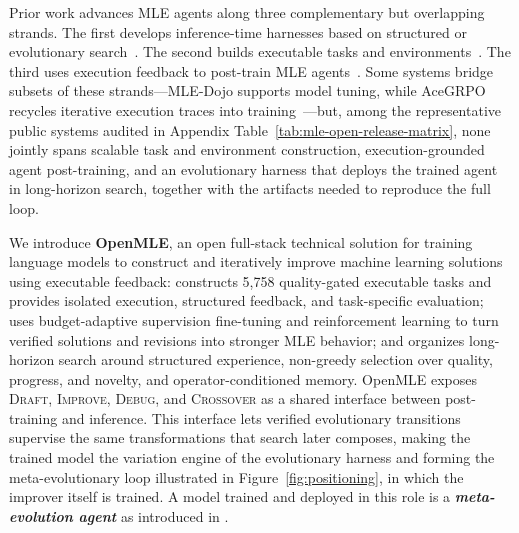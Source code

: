 Prior work advances MLE agents along three complementary but overlapping strands. The first develops inference-time harnesses based on structured or evolutionary search~\citep{jiang2025aide,fang2025mlzero,nam2025mlestar,du2025automlgen,liu2025ml,zhu2026toward,toledo2025airesearchagents,internscience2026mlevolve}. The second builds executable tasks and environments~\citep{qiang2025mledojo,qiang2025mlesmith,nathani2025mlgym,lupidi2026airs}. The third uses execution feedback to post-train MLE agents~\citep{liu2025mlagent,li2025mlerl,yang2025rlmleagents,cai2026acegrpo}. Some systems bridge subsets of these strands---MLE-Dojo supports model tuning, while AceGRPO recycles iterative execution traces into training~\citep{qiang2025mledojo,cai2026acegrpo}---but, among the representative public systems audited in Appendix Table~\ref{tab:mle-open-release-matrix}, none jointly spans scalable task and environment construction, execution-grounded agent post-training, and an evolutionary harness that deploys the trained agent in long-horizon search, together with the artifacts needed to reproduce the full loop.

We introduce \textbf{OpenMLE}, an open full-stack technical solution for training language models to construct and iteratively improve machine learning solutions using executable feedback: \openmlegym{} constructs 5,758 quality-gated executable tasks and provides isolated execution, structured feedback, and task-specific evaluation; \openmleerl{} uses budget-adaptive supervision fine-tuning and reinforcement learning to turn verified solutions and revisions into stronger MLE behavior; and \openmleevo{} organizes long-horizon search around structured experience, non-greedy selection over quality, progress, and novelty, and operator-conditioned memory. OpenMLE exposes \textsc{Draft}, \textsc{Improve}, \textsc{Debug}, and \textsc{Crossover} as a shared interface between post-training and inference. This interface lets verified evolutionary transitions supervise the same transformations that search later composes, making the trained model the variation engine of the evolutionary harness and forming the meta-evolutionary loop illustrated in Figure~\ref{fig:positioning}, in which the improver itself is trained.
A model trained and deployed in this role is a \textbf{\emph{meta-evolution agent}} as introduced in \citep{jiang2026selfimprovingagents}.



